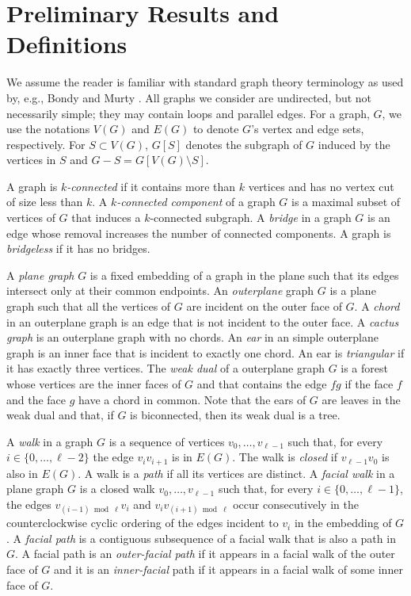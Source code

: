 \documentclass{patmorin}
\begin{document}
\section{Preliminary Results and Definitions}

We assume the reader is familiar with standard graph theory terminology
as used by, e.g., Bondy and Murty \cite{bondy.murty:graph}.  All graphs
we consider are undirected, but not necessarily simple; they may contain
loops and parallel edges.  For a graph, $G$, we use the notations $V(G)$
and $E(G)$ to denote $G$'s vertex and edge sets, respectively. For
$S\subset V(G)$, $G[S]$ denotes the subgraph of $G$ induced by the
vertices in $S$ and $G-S=G[V(G)\setminus S]$.

A graph is \emph{$k$-connected} if it contains more than $k$ vertices
and has no vertex cut of size less than $k$.  A \emph{$k$-connected
component} of a graph $G$ is a maximal subset of vertices of $G$ that
induces a $k$-connected subgraph.  A \emph{bridge} in a graph $G$ is an
edge whose removal increases the number of connected components.
A graph is \emph{bridgeless} if it has no bridges.

A \emph{plane graph} $G$ is a fixed embedding of a graph in the plane
such that its edges intersect only at their common endpoints. An
\emph{outerplane} graph $G$ is a plane graph such that all the
vertices of $G$ are incident on the outer face of $G$. A \emph{chord}
in an outerplane graph is an edge that is not incident to the outer
face. A \emph{cactus graph} is an outerplane graph with no chords.
An \emph{ear} in an simple outerplane graph is an inner face that is
incident to exactly one chord. An ear is \emph{triangular} if it has
exactly three vertices.  The \emph{weak dual} of a outerplane graph $G$
is a forest whose vertices are the inner faces of $G$ and that contains
the edge $fg$ if the face $f$ and the face $g$ have a chord in common.
Note that the ears of $G$ are leaves in the weak dual and that, if $G$
is biconnected, then its weak dual is a tree.

A \emph{walk} in a graph $G$ is a sequence of vertices
$v_0,\ldots,v_{\ell-1}$ such that, for every $i\in\{0,\ldots,\ell-2\}$
the edge $v_iv_{i+1}$ is in $E(G)$.  The walk is \emph{closed} if
$v_{\ell-1}v_0$ is also in $E(G)$.  A walk is a \emph{path} if all
its vertices are distinct.  A \emph{facial walk} in a plane graph
$G$ is a closed walk $v_0,\ldots,v_{\ell-1}$ such that, for every
$i\in\{0,\ldots,\ell-1\}$, the edges $v_{(i-1)\bmod \ell} v_i$ and
$v_iv_{(i+1)\bmod\ell}$ occur consecutively in the counterclockwise
cyclic ordering of the edges incident to $v_i$ in the embedding of $G$.
A \emph{facial path} is a contiguous subsequence of a facial walk that
is also a path in $G$.  A facial path is an \emph{outer-facial path}
if it appears in a facial walk of the outer face of $G$ and it is an
\emph{inner-facial} path if it appears in a facial walk of some inner
face of $G$.
\end{document}
